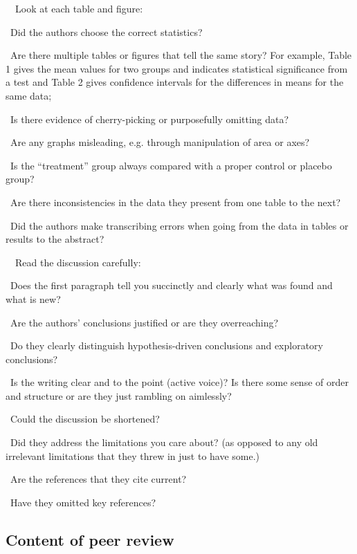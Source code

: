 \documentclass[a4paper, 12pt]{article}
\begin{document}
\par\ \textbullet\ Look at each table and figure:
\par\quad\textopenbullet\ Did the authors choose the correct statistics?
\par\quad\textopenbullet\ Are there multiple tables or figures that tell the same story? For example,
Table 1 gives the mean values for two groups and indicates statistical significance from a test and Table 2 gives confidence intervals for the differences in means for the same data;
\par\quad\textopenbullet\ Is there evidence of cherry-picking or purposefully omitting data?
\par\quad\textopenbullet\ Are any graphs misleading, e.g. through manipulation of area or axes?
\par\quad\textopenbullet\ Is the ``treatment'' group always compared with a proper control or placebo group?
\par\quad\textopenbullet\ Are there inconsistencies in the data they present from one table to the next?
\par\quad\textopenbullet\ Did the authors make transcribing errors when going from the data in tables or results to the abstract?

\newpage\par\ \textbullet\ Read the discussion carefully:
\par\quad\textopenbullet\ Does the first paragraph tell you succinctly and clearly what was found and what is new?
\par\quad\textopenbullet\ Are the authors' conclusions justified or are they overreaching?
\par\quad\textopenbullet\ Do they clearly distinguish hypothesis-driven conclusions and exploratory conclusions?
\par\quad\textopenbullet\ Is the writing clear and to the point (active voice)? Is there some sense of order and structure or are they just rambling on aimlessly?
\par\quad\textopenbullet\ Could the discussion be shortened?
\par\quad\textopenbullet\ Did they address the limitations you care about? (as opposed to any old irrelevant limitations that they threw in just to have some.)
\par\quad\textopenbullet\ Are the references that they cite current?
\par\quad\textopenbullet\ Have they omitted key references?

\newpage\subsection{Content of peer review}
\end{document}
